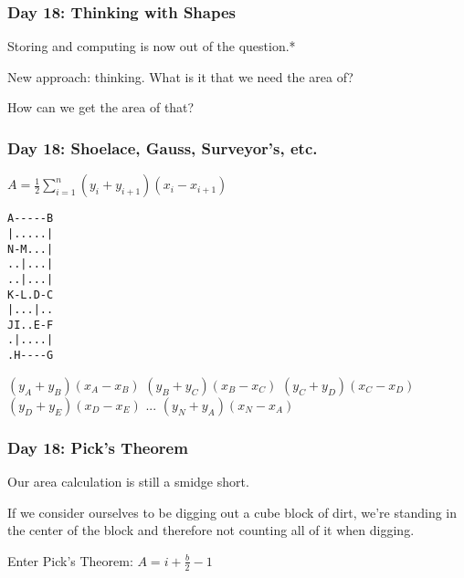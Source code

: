 \begin{frame}
\frametitle{Day 18: Thinking with Shapes}

Storing and computing is now out of the question.*\vfill

New approach: thinking. What is it that we need the area of?\vfill

How can we get the area of that?\vfill

\end{frame}

\begin{frame}[fragile]
\frametitle{Day 18: Shoelace, Gauss, Surveyor's, etc.}

\begin{center}
$A = \frac{1}{2}\sum_{i=1}^{n}(y_i + y_{i+1})(x_i - x_{i+1})$\vfill
\end{center}

\begin{center}

\begin{minipage}{0.3\textwidth}
\begin{center}
\begin{verbatim}
A-----B
|.....|
N-M...|
..|...|
..|...|
K-L.D-C
|...|..
JI..E-F
.|....|
.H----G
\end{verbatim}
\end{center}
\end{minipage}
\begin{minipage}{0.3\textwidth}
\begin{center}
$(y_{A} + y_{B})(x_{A} - x_{B})$
$(y_{B} + y_{C})(x_{B} - x_{C})$
$(y_{C} + y_{D})(x_{C} - x_{D})$
$(y_{D} + y_{E})(x_{D} - x_{E})$
...
$(y_{N} + y_{A})(x_{N} - x_{A})$
\end{center}
\end{minipage}

\end{center}
\vfill

\end{frame}

\begin{frame}
\frametitle{Day 18: Pick's Theorem}

Our area calculation is still a smidge short.\vfill

If we consider ourselves to be digging out a cube block of dirt, we're standing in the center of the block and therefore not counting all of it when digging.\vfill

Enter Pick's Theorem: $A = i + \frac{b}{2} - 1$

\end{frame}